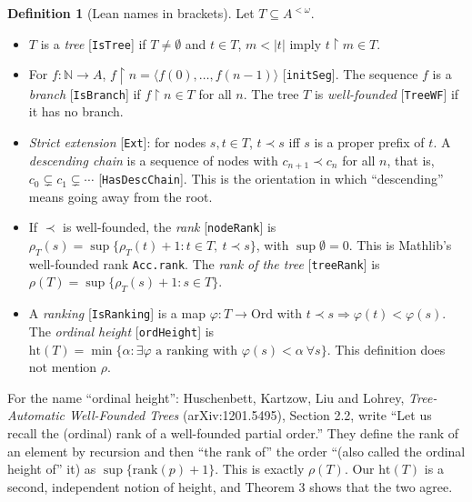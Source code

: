 \documentclass[11pt]{article}
\theoremstyle{definition}
\newtheorem{definition}[theorem]{Definition}
\newcommand{\Ext}{\mathrel{\prec}}
\begin{document}
\begin{definition}[Lean names in brackets]
Let $T\subseteq A^{<\omega}$.
\begin{itemize}
\item $T$ is a \emph{tree} [\texttt{IsTree}] if $T\neq\emptyset$ and $t\in T$, $m<|t|$ imply
  $t{\restriction}m\in T$.
\item For $f:\mathbb N\to A$, $f{\restriction}n=\langle f(0),\dots,f(n-1)\rangle$ [\texttt{initSeg}].
  The sequence $f$ is a \emph{branch} [\texttt{IsBranch}] if $f{\restriction}n\in T$ for all $n$. The
  tree $T$ is \emph{well-founded} [\texttt{TreeWF}] if it has no branch.
\item \emph{Strict extension} [\texttt{Ext}]: for nodes $s,t\in T$, $t\Ext s$ iff $s$ is a proper
  prefix of $t$. A \emph{descending chain} is a sequence of nodes with $c_{n+1}\Ext c_n$ for all $n$,
  that is, $c_0\subsetneq c_1\subsetneq\cdots$ [\texttt{HasDescChain}]. This is the orientation in which
  ``descending'' means going away from the root.
\item If $\Ext$ is well-founded, the \emph{rank} [\texttt{nodeRank}] is
  $\rho_T(s)=\sup\{\rho_T(t)+1:t\in T,\ t\Ext s\}$, with $\sup\emptyset=0$. This is Mathlib's
  well-founded rank \texttt{Acc.rank}. The \emph{rank of the tree} [\texttt{treeRank}] is
  $\rho(T)=\sup\{\rho_T(s)+1:s\in T\}$.
\item A \emph{ranking} [\texttt{IsRanking}] is a map $\varphi:T\to\mathrm{Ord}$ with
  $t\Ext s\Rightarrow\varphi(t)<\varphi(s)$. The \emph{ordinal height} [\texttt{ordHeight}] is
  $\mathrm{ht}(T)=\min\{\alpha:\exists\varphi\text{ a ranking with }\varphi(s)<\alpha\ \forall s\}$.
  This definition does not mention $\rho$.
\end{itemize}
\end{definition}
For the name ``ordinal height'': Huschenbett, Kartzow, Liu and Lohrey, \emph{Tree-Automatic
Well-Founded Trees} (arXiv:1201.5495), Section 2.2, write ``Let us recall the (ordinal) rank of a
well-founded partial order.'' They define the rank of an element by recursion and then ``the rank
of'' the order ``(also called the ordinal height of'' it) as $\sup\{\mathrm{rank}(p)+1\}$. This is
exactly $\rho(T)$. Our $\mathrm{ht}(T)$ is a second, independent notion of height, and Theorem 3 shows
that the two agree.
\end{document}
